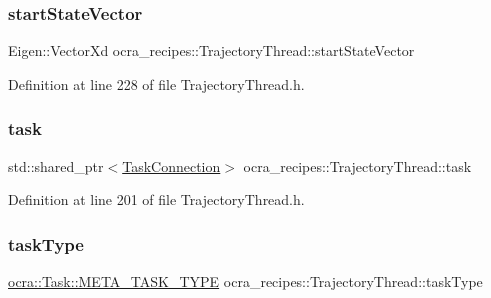 \subsubsection{\texorpdfstring{start\+State\+Vector}{startStateVector}}
{\footnotesize\ttfamily Eigen\+::\+Vector\+Xd ocra\+\_\+recipes\+::\+Trajectory\+Thread\+::start\+State\+Vector\hspace{0.3cm}{\ttfamily [protected]}}



Definition at line 228 of file Trajectory\+Thread.\+h.

\hypertarget{classocra__recipes_1_1TrajectoryThread_a3637e00b27ab63ecc48f813013626cba}{}\label{classocra__recipes_1_1TrajectoryThread_a3637e00b27ab63ecc48f813013626cba} 
\subsubsection{\texorpdfstring{task}{task}}
{\footnotesize\ttfamily std\+::shared\+\_\+ptr$<$\hyperlink{classocra__recipes_1_1TaskConnection}{Task\+Connection}$>$ ocra\+\_\+recipes\+::\+Trajectory\+Thread\+::task\hspace{0.3cm}{\ttfamily [protected]}}



Definition at line 201 of file Trajectory\+Thread.\+h.

\hypertarget{classocra__recipes_1_1TrajectoryThread_a97b08a2471b425e49525b51c9e8eabb4}{}\label{classocra__recipes_1_1TrajectoryThread_a97b08a2471b425e49525b51c9e8eabb4} 
\subsubsection{\texorpdfstring{task\+Type}{taskType}}
{\footnotesize\ttfamily \hyperlink{classocra_1_1Task_a8ddf2840d178ca273e886c9ca95248fe}{ocra\+::\+Task\+::\+M\+E\+T\+A\+\_\+\+T\+A\+S\+K\+\_\+\+T\+Y\+PE} ocra\+\_\+recipes\+::\+Trajectory\+Thread\+::task\+Type\hspace{0.3cm}{\ttfamily [protected]}}



